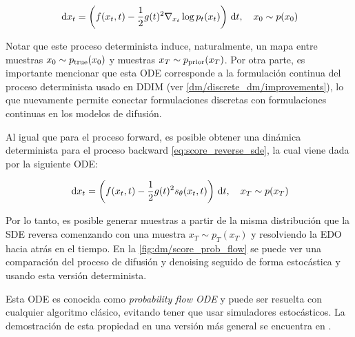 \begin{equation}
    \label{eq:probability_flow_dm}
    \,\operatorname{d}\! x_t = \left(f(x_t,t)-\frac{1}{2}g(t)^2\nabla_{x_t} \log p_t(x_t)\right)\,\operatorname{d}\! t,
    \quad x_0\sim p(x_0)
\end{equation}

Notar que este proceso determinista induce, naturalmente, un mapa  entre muestras $x_0\sim p_{\operatorname{true}}(x_0)$ y muestras $x_T\sim p_{\operatorname{prior}}(x_T)$. Por otra parte, es importante mencionar que esta ODE corresponde a la formulación continua del proceso determinista usado en DDIM (ver \autoref{dm/discrete_dm/improvements}), lo que nuevamente permite conectar formulaciones discretas con formulaciones continuas en los modelos de difusión.

Al igual que para el proceso forward, es posible obtener una dinámica determinista para el proceso backward \eqref{eq:score_reverse_sde}, la cual viene dada por la siguiente ODE:

\begin{equation*}
    \,\operatorname{d}\! x_t = \left(f(x_t,t)-\frac{1}{2}g(t)^2 s_\theta(x_t,t)\right)\,\operatorname{d}\! t,
    \quad x_T\sim p(x_T)
\end{equation*}

Por lo tanto, es posible generar muestras a partir de la misma distribución que la SDE reversa comenzando con una muestra $x_T\sim p_T(x_T)$ y resolviendo la EDO hacia atrás en el tiempo. En la \autoref{fig:dm/score_prob_flow} se puede ver una comparación del proceso de difusión y denoising seguido de forma estocástica y usando esta versión determinista.


Esta ODE es conocida como \textit{probability flow ODE} y puede ser resuelta con cualquier algoritmo clásico, evitando tener que usar simuladores estocásticos. La demostración de esta propiedad en una versión más general se encuentra en \cite{song2021scorebased}.

